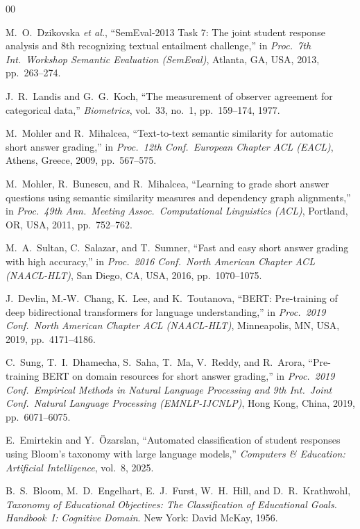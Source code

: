 \documentclass[conference]{IEEEtran}
\begin{document}
\begin{thebibliography}{00}

M.~O.~Dzikovska \emph{et al.},
``SemEval-2013 Task 7: The joint student response analysis and 8th recognizing
textual entailment challenge,''
in \textit{Proc.\ 7th Int.\ Workshop Semantic Evaluation (SemEval)},
Atlanta, GA, USA, 2013, pp.~263--274.

J.~R.~Landis and G.~G.~Koch,
``The measurement of observer agreement for categorical data,''
\textit{Biometrics}, vol.~33, no.~1, pp.~159--174, 1977.

M.~Mohler and R.~Mihalcea,
``Text-to-text semantic similarity for automatic short answer grading,''
in \textit{Proc.\ 12th Conf.\ European Chapter ACL (EACL)},
Athens, Greece, 2009, pp.~567--575.

M.~Mohler, R.~Bunescu, and R.~Mihalcea,
``Learning to grade short answer questions using semantic similarity measures
and dependency graph alignments,''
in \textit{Proc.\ 49th Ann.\ Meeting Assoc.\ Computational Linguistics (ACL)},
Portland, OR, USA, 2011, pp.~752--762.

M.~A.~Sultan, C.~Salazar, and T.~Sumner,
``Fast and easy short answer grading with high accuracy,''
in \textit{Proc.\ 2016 Conf.\ North American Chapter ACL (NAACL-HLT)},
San Diego, CA, USA, 2016, pp.~1070--1075.

J.~Devlin, M.-W.~Chang, K.~Lee, and K.~Toutanova,
``BERT: Pre-training of deep bidirectional transformers for language understanding,''
in \textit{Proc.\ 2019 Conf.\ North American Chapter ACL (NAACL-HLT)},
Minneapolis, MN, USA, 2019, pp.~4171--4186.

C.~Sung, T.~I.~Dhamecha, S.~Saha, T.~Ma, V.~Reddy, and R.~Arora,
``Pre-training BERT on domain resources for short answer grading,''
in \textit{Proc.\ 2019 Conf.\ Empirical Methods in Natural Language Processing
and 9th Int.\ Joint Conf.\ Natural Language Processing (EMNLP-IJCNLP)},
Hong Kong, China, 2019, pp.~6071--6075.

E.~Emirtekin and Y.~Özarslan,
``Automated classification of student responses using Bloom's taxonomy
with large language models,''
\textit{Computers \& Education: Artificial Intelligence}, vol.~8, 2025.

B.~S.~Bloom, M.~D.~Engelhart, E.~J.~Furst, W.~H.~Hill, and D.~R.~Krathwohl,
\textit{Taxonomy of Educational Objectives: The Classification of Educational Goals.
Handbook~I: Cognitive Domain}.
New York: David McKay, 1956.


\end{thebibliography}
\end{document}
